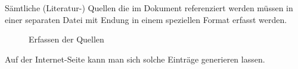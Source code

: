 Sämtliche (Literatur-) Quellen die im Dokument referenziert werden müssen in einer separaten Datei mit Endung  in einem speziellen Format erfasst werden.

\begin{figure}[h!]
\centering
  \caption{Erfassen der Quellen}
  \label{fig:QuellenErfassen}
\end{figure} 

Auf der Internet-Seite  kann man sich solche Einträge generieren lassen.
